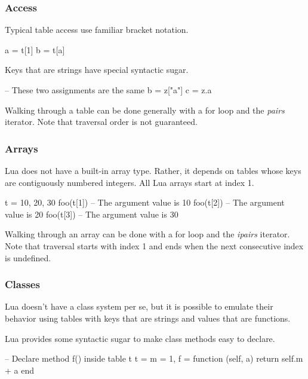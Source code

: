 \documentclass[11pt]{article}
\newcommand{\func}[1]{\mbox{\itshape#1}}
\newcommand{\keyword}[1]{\mbox{\ttfamily#1}}
\begin{document}
\subsubsection{Access}

Typical table access use familiar bracket notation.

\begin{LuaCode}
a = t[1]
b = t[a]
\end{LuaCode}

Keys that are strings have special syntactic sugar.

\begin{LuaCode}
-- These two assignments are the same
b = z["a"]
c = z.a
\end{LuaCode}

Walking through a table can be done generally with a \keyword{for} loop and the \func{pairs}
iterator.  Note that traversal order is not guaranteed.

\subsubsection{Arrays}

Lua does not have a built-in array type.  Rather, it depends on tables whose
keys are contiguously numbered integers.  All Lua arrays start at index 1.

\begin{LuaCode}
t = { 10, 20, 30 }
foo(t[1]) -- The argument value is 10
foo(t[2]) -- The argument value is 20
foo(t[3]) -- The argument value is 30
\end{LuaCode}

Walking through an array can be done with a \keyword{for} loop and the \func{ipairs} iterator.
Note that traversal starts with index 1 and ends when the next consecutive
index is undefined.

\subsubsection{Classes}

Lua doesn't have a class system per se, but it is possible to emulate their
behavior using tables with keys that are strings and values that are functions.

Lua provides some syntactic sugar to make class methods easy to declare.

\begin{LuaCode}
-- Declare method f() inside table t
t = {
	m = 1,
	f = function (self, a)
		return self.m + a
	end
}
\end{LuaCode}
\end{document}

